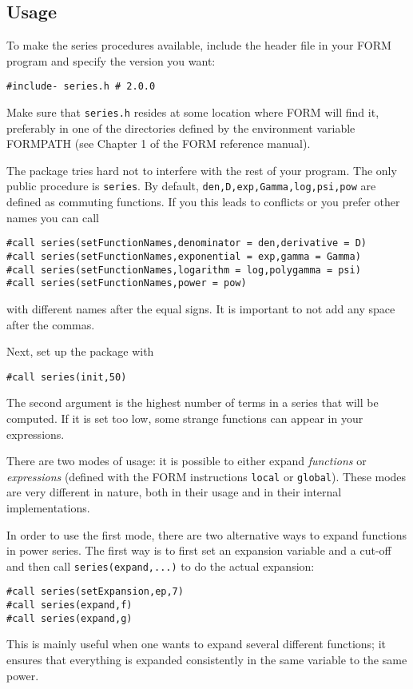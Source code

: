 \documentclass[titlepage]{article}
\begin{document}
\subsection{Usage}
\label{sec:usage}

To make the series procedures available, include the header file in your
FORM program and specify the version you want:
\begin{lstlisting}
#include- series.h # 2.0.0
\end{lstlisting}
Make sure that {\tt series.h} resides at some location where FORM will find
it, preferably in one of the directories defined by the environment
variable \mbox{FORMPATH} (see Chapter 1 of the FORM reference
manual).

The package tries hard not to interfere with the rest of your
program. The only public procedure is \lstinline!series!. By default, \lstinline!den,D,exp,Gamma,log,psi,pow! are defined as commuting functions. If you this leads to conflicts or you prefer other names you can call

\begin{lstlisting}
#call series(setFunctionNames,denominator = den,derivative = D)
#call series(setFunctionNames,exponential = exp,gamma = Gamma)
#call series(setFunctionNames,logarithm = log,polygamma = psi)
#call series(setFunctionNames,power = pow)
\end{lstlisting}
with different names after the equal signs. It is important to not add
any space after the commas.

Next, set up the package with
\begin{lstlisting}
#call series(init,50)
\end{lstlisting}
The second argument is the highest number of terms in a series that
will be computed. If it is set too low, some strange functions can
appear in your expressions.

There are two modes of usage: it is possible to either expand
\emph{functions} or \emph{expressions} (defined with the FORM
instructions \texttt{local} or \texttt{global}). These modes are very
different in nature, both in their usage and in their internal
implementations.

In order to use the first mode, there are two alternative ways to
expand functions in power series. The first way is to first set an
expansion variable and a cut-off and then call
\lstinline!series(expand,...)! to do the actual expansion:
\begin{lstlisting}
#call series(setExpansion,ep,7)
#call series(expand,f)
#call series(expand,g)
\end{lstlisting}
This is mainly useful when one wants to expand several different functions; it
ensures that everything is expanded consistently in the same variable to
the same power.
\end{document}
